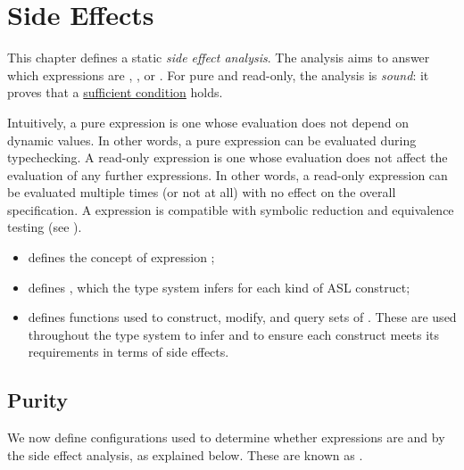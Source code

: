 \chapter{Side Effects\label{chap:SideEffects}}

This chapter defines a static \emph{side effect analysis}.
The analysis aims to answer which expressions are \pureterm{}, \readonlyterm{}, or \symbolicallyevaluableterm{}.
For pure and read-only, the analysis is \emph{sound}: it proves that a \underline{sufficient condition} holds.

Intuitively, a pure expression is one whose evaluation does not depend on dynamic values.
In other words, a pure expression can be evaluated during typechecking.
A read-only expression is one whose evaluation does not affect the evaluation of any further expressions.
In other words, a read-only expression can be evaluated multiple times (or not at all) with no effect on the overall specification.
A \symbolicallyevaluableterm{} expression is compatible with symbolic reduction and equivalence testing (see ).

\ChapterOutline
\begin{itemize}
  \item {} defines the concept of expression \purities{};
  \item {} defines \sideeffectdescriptorsetsterm, which the type system infers
        for each kind of ASL construct;
  \item {} defines functions used to construct, modify, and query sets
        of \sideeffectdescriptorsetsterm{}.
        These are used throughout the type system to infer \sideeffectdescriptorsetsterm{}
        and to ensure each construct meets its requirements in terms of side effects.
\end{itemize}

\section{Purity\label{sec:Purity}}

We now define configurations used to determine whether expressions are \pureterm{} and \readonlyterm{} by the side effect analysis, as explained below.
These are known as \purities{}.

